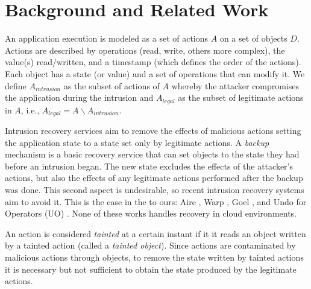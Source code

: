 \documentclass[10pt,conference]{IEEEtran}
\begin{document}
\DIFaddbegin 

\DIFaddend 
\section{Background and Related Work}\label{sec:background}
\DIFdelbegin 
{}\DIFdelend An application execution is modeled as a set of actions $A$ on a set of objects $D$. Actions are described by operations (read, write, others more complex), the value(s) read/written, and a timestamp (which defines the order of the actions). Each object has a state (or value) and a set of operations that can modify it. We define $A_{intrusion}$ as the subset of actions of $A$ whereby the attacker compromises the application during the intrusion \DIFdelbegin {}\DIFdelend and $A_{legal}$ as the subset of legitimate actions in $A$, i.e., $A_{legal} = A \backslash A_{intrusion}$.

Intrusion recovery services aim to remove the effects of malicious actions setting the application state to a state set only by legitimate actions. 
A \textit{backup} mechanism is a basic recovery service that can set objects to the state they had before an intrusion began. The new state excludes the effects of the attacker's actions, but also the effects of any legitimate actions performed after the backup was done. This second aspect is undesirable, so recent intrusion recovery systems aim to avoid it. This is the case in the \DIFdelbegin {}\DIFdelend \DIFaddbegin {}\DIFaddend to ours: Aire \cite{aire}, Warp \cite{warp}, \DIFaddbegin {}\DIFaddend Goel \cite{Akkus2010}, and Undo for Operators (UO) \cite{undoForOperators}. None of these works handles recovery in cloud environments.

An action is considered \textit{tainted} at a certain instant if it \DIFdelbegin {}\DIFdelend \DIFaddbegin {}\DIFaddend it reads an object written by a \DIFaddbegin {}\DIFaddend tainted action (called a \textit{tainted object}). Since actions are contaminated by malicious actions through objects, to remove the state written by tainted actions it is necessary but not sufficient to obtain the state produced by the legitimate actions. \DIFdelbegin 
\end{document}
